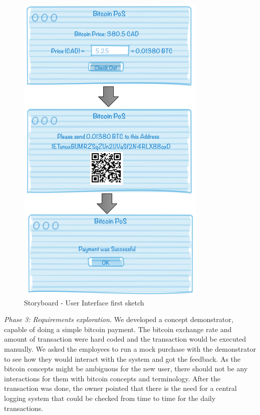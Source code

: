 \begin{figure}[htb]
\centering
\includegraphics[scale=0.5]{fig/RE_Scenario_Interface}
  \caption{Storyboard - User Interface first sketch}
\label{fig:storyboard}
\end{figure}


\textit{Phase 3: Requirements exploration.}
We developed a concept demonstrator, capable of doing a simple bitcoin payment. The bitcoin exchange rate and amount of transaction were hard coded and the transaction would be executed manually. We asked the employees to run a mock purchase with the demonstrator to see how they would interact with the system and got the feedback. As the bitcoin concepts might be ambiguous for the new user, there should not be any interactions for them with bitcoin concepts and terminology. After the transaction was done, the owner pointed that there is the need for a central logging system that could be checked from time to time for the daily transactions.\\


